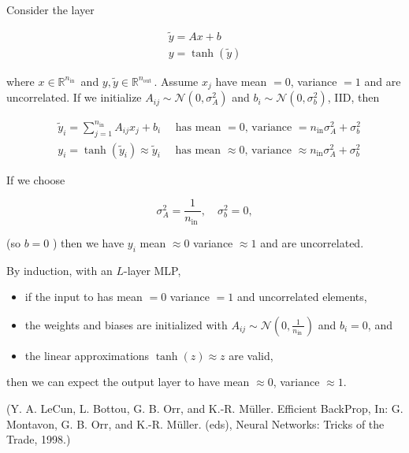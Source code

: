 \documentclass{report}
\begin{document}
\begin{definition}
    Consider the layer

    $$
    \begin{gathered}
    \tilde{y}=A x+b \\
    y=\tanh (\tilde{y})
    \end{gathered}
    $$

    where $x \in \mathbb{R}^{n_{\text {in }}}$ and $y, \tilde{y} \in \mathbb{R}^{n_{\text {out }}}$. Assume $x_{j}$ have mean $=0$, variance $=1$ and are uncorrelated. If we initialize $A_{i j} \sim \mathcal{N}\left(0, \sigma_{A}^{2}\right)$ and $b_{i} \sim \mathcal{N}\left(0, \sigma_{b}^{2}\right)$, IID, then

    $$
    \begin{aligned}
    & \tilde{y}_{i}=\sum_{j=1}^{n_{\mathrm{in}}} A_{i j} x_{j}+b_{i} \quad \text { has mean }=0 \text {, variance }=n_{\mathrm{in}} \sigma_{A}^{2}+\sigma_{b}^{2} \\
    & y_{i}=\tanh \left(\tilde{y}_{i}\right) \approx \tilde{y}_{i} \quad \text { has mean } \approx 0 \text {, variance } \approx n_{\mathrm{in}} \sigma_{A}^{2}+\sigma_{b}^{2}
    \end{aligned}
    $$

    If we choose

    $$
    \sigma_{A}^{2}=\frac{1}{n_{\text {in }}}, \quad \sigma_{b}^{2}=0,
    $$

    (so $b=0$ ) then we have $y_{i}$ mean $\approx 0$ variance $\approx 1$ and are uncorrelated.

    \par\noindent\textcolor{gray}{\hdashrule{\textwidth}{0.4pt}{1pt 2pt}}

    By induction, with an $L$-layer MLP,

    \begin{itemize}
        \item if the input to has mean $=0$ variance $=1$ and uncorrelated elements,
        \item the weights and biases are initialized with $A_{i j} \sim \mathcal{N}\left(0, \frac{1}{n_{\text {in }}}\right)$ and $b_{i}=0$, and
        \item the linear approximations $\tanh (z) \approx z$ are valid,
    \end{itemize}

    then we can expect the output layer to have mean $\approx 0$, variance $\approx 1$.

    (Y. A. LeCun, L. Bottou, G. B. Orr, and K.-R. Müller. Efficient BackProp, In: G. Montavon, G. B. Orr, and K.-R. Müller. (eds), Neural Networks: Tricks of the Trade, 1998.)
\end{definition}
\end{document}
